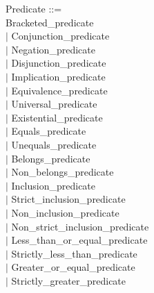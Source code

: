 \documentclass[12pt,a4paper,draft]{article}
\begin{document}
{\begin{sloppypar}
\noindent Predicate ::= \\
\hspace*{0.20in}   Bracketed\_predicate\\
\hspace*{0.20in} $|$  Conjunction\_predicate\\
\hspace*{0.20in} $|$  Negation\_predicate\\
\hspace*{0.20in} $|$  Disjunction\_predicate\\
\hspace*{0.20in} $|$  Implication\_predicate\\
\hspace*{0.20in} $|$  Equivalence\_predicate\\
\hspace*{0.20in} $|$  Universal\_predicate\\
\hspace*{0.20in} $|$  Existential\_predicate\\
\hspace*{0.20in} $|$  Equals\_predicate\\
\hspace*{0.20in} $|$  Unequals\_predicate\\
\hspace*{0.20in} $|$  Belongs\_predicate\\
\hspace*{0.20in} $|$  Non\_belongs\_predicate\\
\hspace*{0.20in} $|$  Inclusion\_predicate\\
\hspace*{0.20in} $|$  Strict\_inclusion\_predicate\\
\hspace*{0.20in} $|$  Non\_inclusion\_predicate\\
\hspace*{0.20in} $|$  Non\_strict\_inclusion\_predicate\\
\hspace*{0.20in} $|$  Less\_than\_or\_equal\_predicate\\
\hspace*{0.20in} $|$  Strictly\_less\_than\_predicate\\
\hspace*{0.20in} $|$  Greater\_or\_equal\_predicate\\
\hspace*{0.20in} $|$  Strictly\_greater\_predicate\\

\end{sloppypar}}
\end{document}
